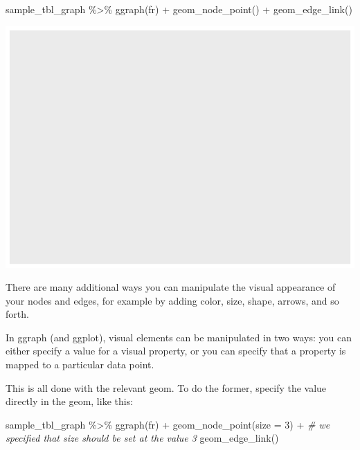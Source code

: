 \documentclass[
]{book}
\newenvironment{Shaded}{\begin{snugshade}}{\end{snugshade}}
\newcommand{\AttributeTok}[1]{\textcolor[rgb]{0.77,0.63,0.00}{#1}}
\newcommand{\CommentTok}[1]{\textcolor[rgb]{0.56,0.35,0.01}{\textit{#1}}}
\newcommand{\DecValTok}[1]{\textcolor[rgb]{0.00,0.00,0.81}{#1}}
\newcommand{\FunctionTok}[1]{\textcolor[rgb]{0.00,0.00,0.00}{#1}}
\newcommand{\NormalTok}[1]{#1}
\newcommand{\SpecialCharTok}[1]{\textcolor[rgb]{0.00,0.00,0.00}{#1}}
\newcommand{\StringTok}[1]{\textcolor[rgb]{0.31,0.60,0.02}{#1}}
\begin{document}
\begin{Shaded}
\begin{Highlighting}[]
\NormalTok{sample\_tbl\_graph }\SpecialCharTok{\%\textgreater{}\%} 
  \FunctionTok{ggraph}\NormalTok{(}\StringTok{\textquotesingle{}fr\textquotesingle{}}\NormalTok{) }\SpecialCharTok{+} 
  \FunctionTok{geom\_node\_point}\NormalTok{() }\SpecialCharTok{+} 
  \FunctionTok{geom\_edge\_link}\NormalTok{()}
\end{Highlighting}
\end{Shaded}

\includegraphics{_main_files/figure-latex/unnamed-chunk-58-1.pdf}

There are many additional ways you can manipulate the visual appearance of your nodes and edges, for example by adding color, size, shape, arrows, and so forth.

In ggraph (and ggplot), visual elements can be manipulated in two ways: you can either specify a value for a visual property, or you can specify that a property is mapped to a particular data point.

This is all done with the relevant geom. To do the former, specify the value directly in the geom, like this:

\begin{Shaded}
\begin{Highlighting}[]
\NormalTok{sample\_tbl\_graph }\SpecialCharTok{\%\textgreater{}\%} 
  \FunctionTok{ggraph}\NormalTok{(}\StringTok{\textquotesingle{}fr\textquotesingle{}}\NormalTok{) }\SpecialCharTok{+} 
  \FunctionTok{geom\_node\_point}\NormalTok{(}\AttributeTok{size =} \DecValTok{3}\NormalTok{) }\SpecialCharTok{+} \CommentTok{\# we specified that size should be set at the value 3}
  \FunctionTok{geom\_edge\_link}\NormalTok{()}
\end{Highlighting}
\end{Shaded}
\end{document}
